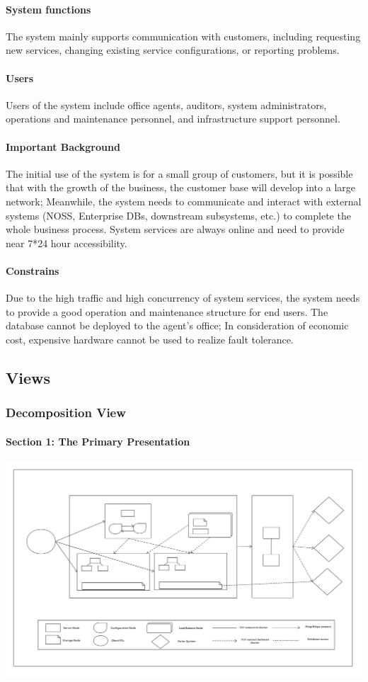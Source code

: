\documentclass{article}
\begin{document}
	\paragraph{System functions}
	The system mainly supports communication with customers, including requesting new services, changing existing service configurations, or reporting problems.
	\paragraph{Users}
	Users of the system include office agents, auditors, system administrators, operations and maintenance personnel, and infrastructure support personnel.
	\paragraph{Important Background}
	The initial use of the system is for a small group of customers, but it is possible that with the growth of the business, the customer base will develop into a large network; Meanwhile, the system needs to communicate and interact with external systems (NOSS, Enterprise DBs, downstream subsystems, etc.) to complete the whole business process. System services are always online and need to provide near 7*24 hour accessibility.
	\paragraph{Constrains}
	Due to the high traffic and high concurrency of system services, the system needs to provide a good operation and maintenance structure for end users. The database cannot be deployed to the agent's office; In consideration of economic cost, expensive hardware cannot be used to realize fault tolerance.
	
	\subsection{Views}
		\subsubsection{Decomposition View} 
			\paragraph{Section 1: The Primary Presentation}
			\begin{center}
			\includegraphics[scale=0.15]{decom_section1.png}
			\end{center}
\end{document}
